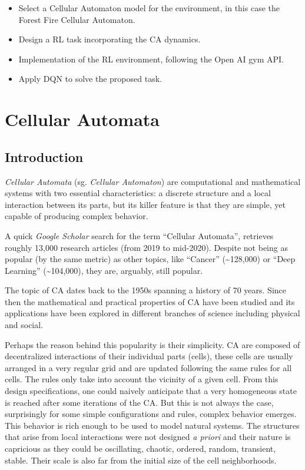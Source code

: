\documentclass[
  12pt,
  openany]{book}
\providecommand{\tightlist}{%
  \setlength{\itemsep}{0pt}\setlength{\parskip}{0pt}}
\begin{document}
\begin{itemize}
\tightlist
\item
  Select a Cellular Automaton model for the environment, in this case the Forest Fire Cellular Automaton.
\item
  Design a RL task incorporating the CA dynamics.
\item
  Implementation of the RL environment, following the Open AI gym API.
\item
  Apply DQN to solve the proposed task.
\end{itemize}

\hypertarget{cellular-automata}{%
\chapter{Cellular Automata}\label{cellular-automata}}

\hypertarget{introduction-1}{%
\section{Introduction}\label{introduction-1}}

\emph{Cellular Automata} (sg. \emph{Cellular Automaton}) are computational and mathematical systems with two essential characteristics: a discrete structure and a local interaction between its parts, but its killer feature is that they are simple, yet capable of producing complex behavior.

A quick \emph{Google Scholar} search for the term ``Cellular Automata'', retrieves roughly 13,000 research articles (from 2019 to mid-2020). Despite not being as popular (by the same metric) as other topics, like ``Cancer'' (\textasciitilde128,000) or ``Deep Learning'' (\textasciitilde104,000), they are, arguably, still popular.

The topic of CA dates back to the 1950s spanning a history of 70 years. Since then the mathematical and practical properties of CA have been studied and its applications have been explored in different branches of science including physical and social.

Perhaps the reason behind this popularity is their simplicity. CA are composed of decentralized interactions of their individual parts (cells), these cells are usually arranged in a very regular grid and are updated following the same rules for all cells. The rules only take into account the vicinity of a given cell. From this design specifications, one could naively anticipate that a very homogeneous state is reached after some iterations of the CA. But this is not always the case, surprisingly for some simple configurations and rules, complex behavior emerges. This behavior is rich enough to be used to model natural systems. The structures that arise from local interactions were not designed \emph{a priori} and their nature is capricious as they could be oscillating, chaotic, ordered, random, transient, stable. Their scale is also far from the initial size of the cell neighborhoods.
\end{document}
